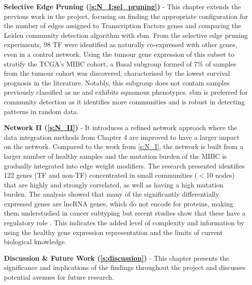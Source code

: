 \textbf{Selective Edge Pruning (\cref{s:N_I:sel_pruning})} - This chapter extends the previous work in the project, focusing on finding the appropriate configuration for the number of edges assigned to Transcription Factors genes and comparing the Leiden community detection algorithm with \acrfull{sbm}. From the selective edge pruning experiments, 98 TF were identified as naturally co-expressed with other genes, even in a control network. Using the tumour gene expression of this subset to stratify the TCGA's MIBC cohort, a Basal subgroup formed of 7\% of samples from the tumour cohort was discovered, characterised by the lowest survival prognosis in the literature. Notably, this subgroup does not contain samples previously classified as \acrlong{ne} and exhibits squamous phenotypes. \acrshort{sbm} is preferred for community detection as it identifies more communities and is robust in detecting patterns in random data.


\textbf{Network II (\cref{s:N_II})} - It introduces a refined network approach where the data integration methods from Chapter 4 are improved to have a larger impact on the network. Compared to the work from \cref{s:N_I}, the network is built from a larger number of healthy samples and the mutation burden of the MIBC is gradually integrated into edge weight modifiers. The research presented identifies 122 genes (TF and non-TF) concentrated in small communities (\(<\)10 nodes) that are highly and strongly correlated, as well as having a high mutation burden. The analysis showed that many of the significantly differentially expressed genes are \acrlong{lncRNA} genes, which do not encode for proteins, making them understudied in cancer subtyping but recent studies show that these have a regulatory role \citep{Statello2021-md}. This indicates the added level of complexity and information by using the healthy gene expression representation and the limits of current biological knowledge.


\textbf{Discussion \& Future Work (\cref{s:discussion})} - This chapter presents the significance and implications of the findings throughout the project and discusses potential avenues for future research.




